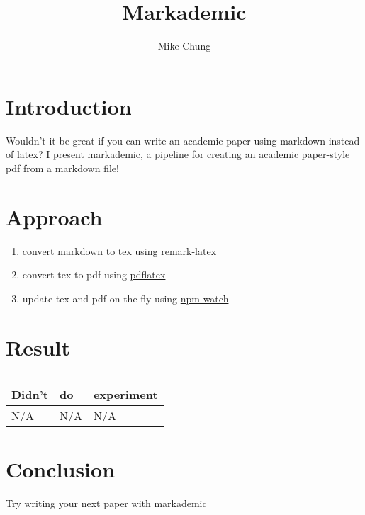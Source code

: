 \documentclass{article}
\title{Markademic}
\author{Mike Chung}
\begin{document}
\maketitle

\section{Introduction}


Wouldn't it be great if you can write an academic paper using markdown instead of latex?
I present markademic, a pipeline for creating an academic paper-style pdf from a markdown file!


\section{Approach}

\begin{enumerate}
[start=1]
\item 
convert markdown to tex using \href{https://github.com/Paperist/remark-latex}{remark-latex}

\item 
convert tex to pdf using \href{https://www.tug.org/applications/pdftex/}{pdflatex}

\item 
update tex and pdf on-the-fly using \href{https://www.npmjs.com/package/npm-watch}{npm-watch}

\end{enumerate}

\section{Result}


\begin{table}[tb]
\begin{center}
\caption{}
\begin{tabular}{l|ll}
\hline\hline
Didn't & 
do & 
experiment \\ 
\hline
N/A & 
N/A & 
N/A \\ 
\hline
\end{tabular}
\end{center}
\end{table}


\section{Conclusion}


Try writing your next paper with markademic
\end{document}
